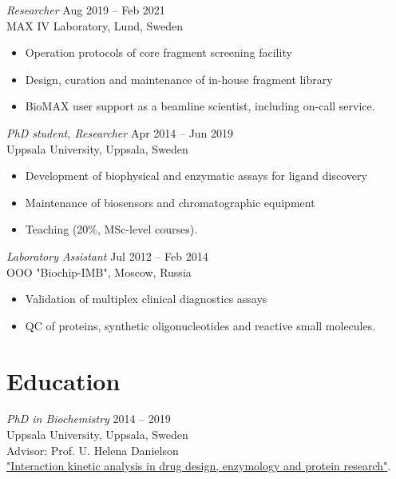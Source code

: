 \documentclass[margin]{res}
\begin{document}
\begin{resume}
            {\sl Researcher} \hfill Aug 2019 -- Feb 2021 \\
            MAX IV Laboratory, Lund, Sweden
            \begin{itemize}
            \setlength\itemsep{0em}
            \item Operation protocols of core fragment screening facility
            \item Design, curation and maintenance of in-house fragment library
            \item BioMAX user support as a beamline scientist, including on-call service.
            \end{itemize}
            
            {\sl PhD student, Researcher} \hfill Apr 2014 -- Jun 2019 \\
            Uppsala University, Uppsala, Sweden
            \begin{itemize}
            \setlength\itemsep{0em}
            \item Development of biophysical and enzymatic assays for ligand discovery
            \item Maintenance of biosensors and chromatographic equipment
            \item Teaching (20\%, MSc-level courses).
            \end{itemize}
            
            {\sl Laboratory Assistant} \hfill Jul 2012 -- Feb 2014 \\
            OOO "Biochip-IMB", Moscow, Russia
            \begin{itemize}
            \setlength\itemsep{0em}
            \item Validation of multiplex clinical diagnostics assays
            \item QC of proteins, synthetic oligonucleotides and reactive small molecules.
            \end{itemize}
         
        \section{Education} 

            {\sl PhD in Biochemistry} \hfill 2014 -- 2019 \\
            Uppsala University, Uppsala, Sweden \\
            Advisor: Prof. U. Helena Danielson \\
            \href{http://uu.diva-portal.org/smash/record.jsf?pid=diva2%3A1256395&dswid=214}{"Interaction kinetic analysis in drug design, enzymology and protein research"}.
            

\end{resume}
\end{document}
